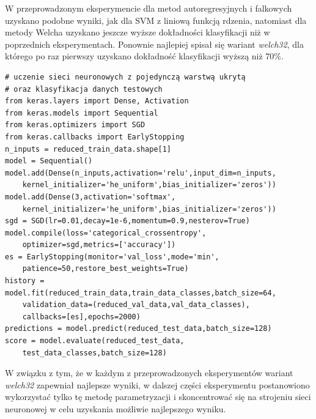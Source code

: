\documentclass[notitlepage]{report}
\begin{document}
W przeprowadzonym eksperymencie dla metod autoregresyjnych i falkowych  uzyskano podobne wyniki, jak dla SVM z liniową funkcją rdzenia, natomiast dla metody Welcha uzyskano jeszcze wyższe dokładności klasyfikacji niż w poprzednich eksperymentach. Ponownie najlepiej spisał się wariant \textit{welch32}, dla którego po raz pierwszy uzyskano dokładność klasyfikacji wyższą niż 70\%.
\newpage
\begin{lstlisting}
# uczenie sieci neuronowych z pojedynczą warstwą ukrytą
# oraz klasyfikacja danych testowych
from keras.layers import Dense, Activation
from keras.models import Sequential
from keras.optimizers import SGD
from keras.callbacks import EarlyStopping
n_inputs = reduced_train_data.shape[1]
model = Sequential()
model.add(Dense(n_inputs,activation='relu',input_dim=n_inputs,
	kernel_initializer='he_uniform',bias_initializer='zeros'))
model.add(Dense(3,activation='softmax',
	kernel_initializer='he_uniform',bias_initializer='zeros'))
sgd = SGD(lr=0.01,decay=1e-6,momentum=0.9,nesterov=True)
model.compile(loss='categorical_crossentropy',
	optimizer=sgd,metrics=['accuracy'])
es = EarlyStopping(monitor='val_loss',mode='min',
	patience=50,restore_best_weights=True)
history = model.fit(reduced_train_data,train_data_classes,batch_size=64,
	validation_data=(reduced_val_data,val_data_classes),
	callbacks=[es],epochs=2000)
predictions = model.predict(reduced_test_data,batch_size=128)
score = model.evaluate(reduced_test_data,
	test_data_classes,batch_size=128)
\end{lstlisting}

W związku z tym, że w każdym z przeprowadzonych eksperymentów wariant \textit{welch32} zapewniał najlepsze wyniki, w dalszej części eksperymentu postanowiono wykorzystać tylko tę metodę parametryzacji i skoncentrować się na strojeniu sieci neuronowej w celu uzyskania możliwie najlepszego wyniku. 
\end{document}
